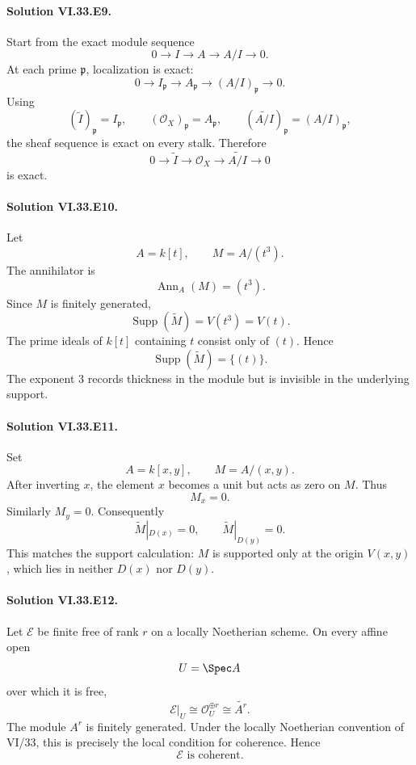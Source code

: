 \paragraph{Solution VI.33.E9.}
Start from the exact module sequence
\[
0\longrightarrow I\longrightarrow A\longrightarrow A/I\longrightarrow0.
\]
At each prime \(\mathfrak p\), localization is exact:
\[
0\longrightarrow I_{\mathfrak p}
\longrightarrow A_{\mathfrak p}
\longrightarrow (A/I)_{\mathfrak p}
\longrightarrow0.
\]
Using
\[
(\widetilde I)_{\mathfrak p}=I_{\mathfrak p},
\qquad
(\mathcal O_X)_{\mathfrak p}=A_{\mathfrak p},
\qquad
(\widetilde{A/I})_{\mathfrak p}=(A/I)_{\mathfrak p},
\]
the sheaf sequence is exact on every stalk. Therefore
\[
\boxed{
0\to\widetilde I\to\mathcal O_X\to\widetilde{A/I}\to0
}
\]
is exact.

\paragraph{Solution VI.33.E10.}
Let
\[
A=k[t],
\qquad
M=A/(t^3).
\]
The annihilator is
\[
\operatorname{Ann}_A(M)=(t^3).
\]
Since \(M\) is finitely generated,
\[
\operatorname{Supp}(\widetilde M)
=
V(t^3)
=
V(t).
\]
The prime ideals of \(k[t]\) containing \(t\) consist only of \((t)\). Hence
\[
\boxed{\operatorname{Supp}(\widetilde M)=\{(t)\}}.
\]
The exponent \(3\) records thickness in the module but is invisible in the underlying support.

\paragraph{Solution VI.33.E11.}
Set
\[
A=k[x,y],
\qquad
M=A/(x,y).
\]
After inverting \(x\), the element \(x\) becomes a unit but acts as zero on \(M\). Thus
\[
M_x=0.
\]
Similarly \(M_y=0\). Consequently
\[
\boxed{
\widetilde M|_{D(x)}=0,
\qquad
\widetilde M|_{D(y)}=0.
}
\]
This matches the support calculation: \(M\) is supported only at the origin \(V(x,y)\), which lies in neither
\(D(x)\) nor \(D(y)\).

\paragraph{Solution VI.33.E12.}
Let \(\mathcal E\) be finite free of rank \(r\) on a locally Noetherian scheme. On every affine open
\[
U=\Spec A
\]
over which it is free,
\[
\mathcal E|_U\cong\mathcal O_U^{\oplus r}\cong\widetilde{A^r}.
\]
The module \(A^r\) is finitely generated.  Under the locally Noetherian convention of VI/33, this is precisely the
local condition for coherence. Hence
\[
\boxed{\mathcal E\text{ is coherent}}.
\]

